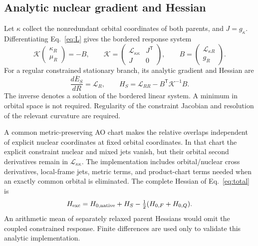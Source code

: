 \documentclass[11pt,a4paper]{article}
\begin{document}
\subsection{Analytic nuclear gradient and Hessian}
Let $\kappa$ collect the nonredundant orbital coordinates of both parents, and $J=g_\kappa$. Differentiating Eq.~\eqref{eq:L} gives the bordered response system
\begin{equation}
 \mathcal K
 \begin{pmatrix}\kappa_R\\\mu_R\end{pmatrix}
 =-B,\qquad
 \mathcal K=\begin{pmatrix}\mathcal L_{\kappa\kappa}&J^{\mathsf T}\\J&0\end{pmatrix},
 \qquad B=\begin{pmatrix}\mathcal L_{\kappa R}\\g_R\end{pmatrix}.
\end{equation}
For a regular constrained stationary branch, its analytic gradient and Hessian are
\begin{equation}
 \frac{d\overline E_S}{dR}=\mathcal L_R,\qquad
 H_S=\mathcal L_{RR}-B^{\mathsf T}\mathcal K^{-1}B.\label{eq:hessian}
\end{equation}
The inverse denotes a solution of the bordered linear system. A minimum in orbital space is not required. Regularity of the constraint Jacobian and resolution of the relevant curvature are required.

A common metric-preserving AO chart makes the relative overlaps independent of explicit nuclear coordinates at fixed orbital coordinates. In that chart the explicit constraint nuclear and mixed jets vanish, but their orbital second derivatives remain in $\mathcal L_{\kappa\kappa}$. The implementation includes orbital/nuclear cross derivatives, local-frame jets, metric terms, and product-chart terms needed when an exactly common orbital is eliminated. The complete Hessian of Eq.~\eqref{eq:total} is
\begin{equation}
 H_{\rm exc}=H_{0,\rm native}+H_S-\tfrac12(H_{0,F}+H_{0,Q}).
\end{equation}
An arithmetic mean of separately relaxed parent Hessians would omit the coupled constrained response. Finite differences are used only to validate this analytic implementation.
\end{document}
